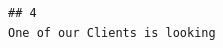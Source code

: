\documentclass[11pt,a4paper,]{article}
\begin{document}
\begin{verbatim}
## 4                                                                                                                                                                                                                                                                                                                                                                                                                                                                                                                                                                                                                                                                                                                                                                                                                                                                                                                                                                                                                                                                                                                                                                                                                                                                                                                                                                                                                                                                                                                                                                                                                                                                                                                                                                                                                                                                                                                                                                                                                                                                                                                                                                                                                                                                                                                                                                                                                                                                                                                                                                                                                                                                                                                                                                                                                                                                                                                                                                                                                                                                                                                                                                                                                                                                                                                                                                                                                     One of our Clients is looking 
\end{verbatim}
\end{document}
